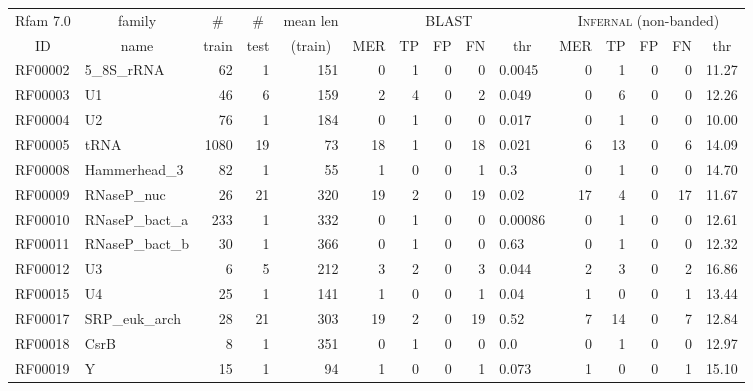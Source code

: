 \documentclass[11pt]{article}
\renewcommand{\baselinestretch}{1.5}
\renewcommand{\baselinestretch}{1.5}
\begin{document}
\renewcommand{\baselinestretch}{1.0}
\begin{table}
\scriptsize
\begin{center}
\begin{tabular}{|ll|rrr|rrrrl|rrrrr|} \hline
\multicolumn{1}{|c}{Rfam 7.0} & \multicolumn{1}{c|}{family} &
\multicolumn{1}{c}{\#} & \multicolumn{1}{c}{\#} &
\multicolumn{1}{c}{mean len} & \multicolumn{5}{|c|}{\textsc{BLAST}} &
\multicolumn{5}{|c|}{\textsc{Infernal} (non-banded)} \\ 
\multicolumn{1}{|c}{ID} & \multicolumn{1}{c|}{name} & \multicolumn{1}{c}{train} & \multicolumn{1}{c}{test} & \multicolumn{1}{c|}{(train)} & \multicolumn{1}{c}{MER} & \multicolumn{1}{c}{TP} & \multicolumn{1}{c}{FP} & \multicolumn{1}{c}{FN} & \multicolumn{1}{c|}{thr} & \multicolumn{1}{c}{MER} & \multicolumn{1}{c}{TP} & \multicolumn{1}{c}{FP} & \multicolumn{1}{c}{FN} & \multicolumn{1}{c|}{thr} \\ \hline 
RF00002 & 5\_8S\_rRNA & 62 & 1 & 151 & 0 & 1 & 0 & 0 & 0.0045 & 0 & 1 & 0 & 0 &  11.27 \\  
RF00003 & U1 & 46 & 6 & 159 & 2 & 4 & 0 & 2 &  0.049 & 0 & 6 & 0 & 0 &  12.26 \\  
RF00004 & U2 & 76 & 1 & 184 & 0 & 1 & 0 & 0 &  0.017 & 0 & 1 & 0 & 0 &     10.00 \\  
RF00005 & tRNA & 1080 & 19 & 73 & 18 & 1 & 0 & 18 &  0.021 & 6 & 13 & 0 & 6 &  14.09 \\  
RF00008 & Hammerhead\_3 & 82 & 1 & 55 & 1 & 0 & 0 & 1 &    0.3 & 0 & 1 & 0 & 0 &   14.70 \\  
RF00009 & RNaseP\_nuc & 26 & 21 & 320 & 19 & 2 & 0 & 19 &   0.02 & 17 & 4 & 0 & 17 &  11.67 \\  
RF00010 & RNaseP\_bact\_a & 233 & 1 & 332 & 0 & 1 & 0 & 0 & 0.00086 & 0 & 1 & 0 & 0 &  12.61 \\  
RF00011 & RNaseP\_bact\_b & 30 & 1 & 366 & 0 & 1 & 0 & 0 &   0.63 & 0 & 1 & 0 & 0 &  12.32 \\  
RF00012 & U3 & 6 & 5 & 212 & 3 & 2 & 0 & 3 &  0.044 & 2 & 3 & 0 & 2 &  16.86 \\  
RF00015 & U4 & 25 & 1 & 141 & 1 & 0 & 0 & 1 &   0.04 & 1 & 0 & 0 & 1 &  13.44 \\  
RF00017 & SRP\_euk\_arch & 28 & 21 & 303 & 19 & 2 & 0 & 19 &   0.52 & 7 & 14 & 0 & 7 &  12.84 \\  
RF00018 & CsrB & 8 & 1 & 351 & 0 & 1 & 0 & 0 &      0.0 & 0 & 1 & 0 & 0 &  12.97 \\  
RF00019 & Y & 15 & 1 & 94 & 1 & 0 & 0 & 1 &  0.073 & 1 & 0 & 0 & 1 &   15.10 \\  

\end{tabular}
\end{center}
\end{table}
\end{document}
